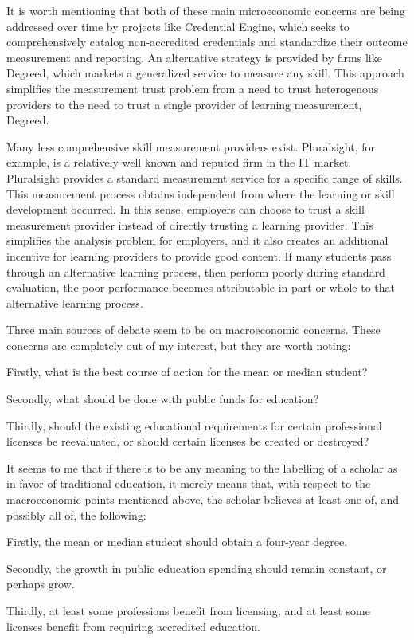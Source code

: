 \documentclass[AER]{/Users/zyl357/Documents/GitHub/research-dissertation-case-for-alt-ed/papers/alt-ed-survey/aea-latex-templates/AEA}
\begin{document}
It is worth mentioning that both of these main microeconomic concerns are
being addressed over time by projects like Credential Engine, which seeks
to comprehensively catalog non-accredited credentials and standardize
their outcome measurement and reporting. An alternative strategy is
provided by firms like Degreed, which markets a generalized service to
measure any skill. This approach simplifies the measurement trust problem
from a need to trust heterogenous providers to the need to trust a single
provider of learning measurement, Degreed.

Many less comprehensive skill measurement providers exist. Pluralsight,
for example, is a relatively well known and reputed firm in the IT market.
Pluralsight provides a standard measurement service for a specific range
of skills. This measurement process obtains independent from where the
learning or skill development occurred. In this sense, employers can
choose to trust a skill measurement provider instead of directly trusting
a learning provider. This simplifies the analysis problem for employers,
and it also creates an additional incentive for learning providers to
provide good content. If many students pass through an alternative
learning process, then perform poorly during standard evaluation, the poor
performance becomes attributable in part or whole to that alternative
learning process.

Three main sources of debate seem to be on macroeconomic concerns. These
concerns are completely out of my interest, but they are worth noting:

Firstly, what is the best course of action for the mean or median student?

Secondly, what should be done with public funds for education?

Thirdly, should the existing educational requirements for certain professional
licenses be reevaluated, or should certain licenses be created or
destroyed?

It seems to me that if there is to be any meaning to the labelling of a
scholar as in favor of traditional education, it merely means that, with
respect to the macroeconomic points mentioned above, the scholar believes
at least one of, and possibly all of, the following:

Firstly, the mean or median student should obtain a four-year degree.

Secondly, the growth in public education spending should remain constant, or perhaps
grow.

Thirdly, at least some professions benefit from licensing, and at least some
licenses benefit from requiring accredited education.
\end{document}
